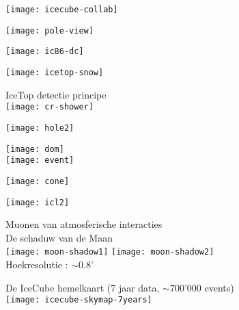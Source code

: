 \onecolumn
\begin{center}
\texttt{[image: icecube-collab]}
\end{center}

\Tr
\begin{center}
\texttt{[image: pole-view]}
\end{center}

\Tr
\begin{center}
\texttt{[image: ic86-dc]}
\end{center}

\Tr
\begin{center}
\texttt{[image: icetop-snow]}
\end{center}

\Tr
\begin{center}
{\blue IceTop detectie principe}\\[5mm] 
\texttt{[image: cr-shower]}
\end{center}

\Tr
\begin{center}
\texttt{[image: hole2]}
\end{center}

\Tr
{}
\begin{center}
\texttt{[image: dom]}\\[3mm]
\texttt{[image: event]}
\end{center}
%
\newpage
%
\begin{center}
\texttt{[image: cone]}
\end{center}

\Tr
\onecolumn
\begin{center}
\texttt{[image: icl2]}
\end{center}

\Tr
\onecolumn
\begin{center}
{\red Muonen van atmosferische interacties}\\[1cm]
{\blue De schaduw van de Maan}\\[5mm]
\texttt{[image: moon-shadow1]}
\texttt{[image: moon-shadow2]}\\[1cm]
{\blue Hoekresolutie : $\sim 0.8^{\circ}$}
\end{center}

\Tr
\onecolumn
\begin{center}
{\blue De IceCube hemelkaart} (7 jaar data, $\sim$700'000 events)\\[5mm]
\texttt{[image: icecube-skymap-7years]}
\end{center}
